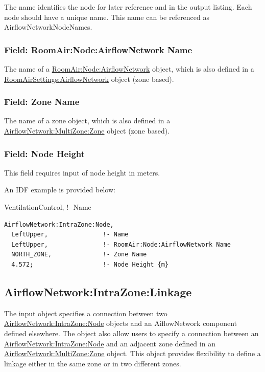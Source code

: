 The name identifies the node for later reference and in the output listing. Each node should have a unique name. This name can be referenced as AirflowNetworkNodeNames.

\subsubsection{Field: RoomAir:Node:AirflowNetwork Name}\label{field-roomairnodeairflownetwork-name}

The name of a \hyperref[roomairnodeairflownetwork]{RoomAir:Node:AirflowNetwork} object, which is also defined in a \hyperref[roomairsettingsairflownetwork]{RoomAirSettings:AirflowNetwork} object (zone based).

\subsubsection{Field: Zone Name}\label{field-zone-name-1-000}

The name of a zone object, which is also defined in a \hyperref[airflownetworkmultizonezone]{AirflowNetwork:MultiZone:Zone} object (zone based).

\subsubsection{Field: Node Height}\label{field-node-height}

This field requires input of node height in meters.

An IDF example is provided below:

VentilationControl, !- Name

\begin{lstlisting}
AirflowNetwork:IntraZone:Node,
  LeftUpper,               !- Name
  LeftUpper,               !- RoomAir:Node:AirflowNetwork Name
  NORTH_ZONE,              !- Zone Name
  4.572;                   !- Node Height {m}
\end{lstlisting}

\subsection{AirflowNetwork:IntraZone:Linkage}\label{airflownetworkintrazonelinkage}

The input object specifies a connection between two \hyperref[airflownetworkintrazonenode]{AirflowNetwork:IntraZone:Node} objects and an AiflowNetwork component defined elsewhere. The object also allow users to specify a connection between an \hyperref[airflownetworkintrazonenode]{AirflowNetwork:IntraZone:Node} and an adjacent zone defined in an \hyperref[airflownetworkmultizonezone]{AirflowNetwork:MultiZone:Zone} object. This object provides flexibility to define a linkage either in the same zone or in two different zones.

